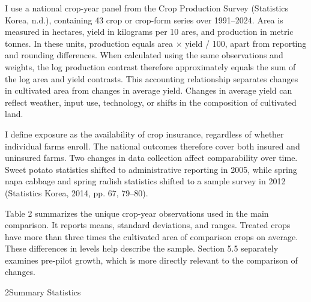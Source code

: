 

I use a national crop-year panel from the Crop Production Survey (Statistics Korea, n.d.), containing 43 crop or crop-form series over 1991--2024. Area is measured in hectares, yield in kilograms per 10 ares, and production in metric tonnes. In these units, production equals area × yield / 100, apart from reporting and rounding differences. When calculated using the same observations and weights, the log production contrast therefore approximately equals the sum of the log area and yield contrasts. This accounting relationship separates changes in cultivated area from changes in average yield. Changes in average yield can reflect weather, input use, technology, or shifts in the composition of cultivated land.

I define exposure as the availability of crop insurance, regardless of whether individual farms enroll. The national outcomes therefore cover both insured and uninsured farms. Two changes in data collection affect comparability over time. Sweet potato statistics shifted to administrative reporting in 2005, while spring napa cabbage and spring radish statistics shifted to a sample survey in 2012 (Statistics Korea, 2014, pp. 67, 79--80).

Table 2 summarizes the unique crop-year observations used in the main comparison. It reports means, standard deviations, and ranges. Treated crops have more than three times the cultivated area of comparison crops on average. These differences in levels help describe the sample. Section 5.5 separately examines pre-pilot growth, which is more directly relevant to the comparison of changes.

\begin{wordtable}{2}{Summary Statistics}

\end{wordtable}


